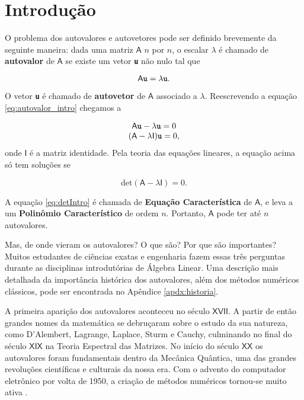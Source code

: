 \chapter{Introdução}
\label{cap:introducao}


	O problema dos autovalores e autovetores pode ser definido brevemente da seguinte maneira: dada uma matriz $\mathsf{A}$ $n$ por $n$, o escalar $\lambda$ é chamado de \textbf{autovalor} de $\mathsf{A}$ se existe um vetor \textbf{\texttt{u}} não nulo tal que

\begin{equation}\label{eq:autovalor_intro}
	\mathsf{A} \textbf{\texttt{u}} = \lambda \textbf{\texttt{u}}.
\end{equation}

O vetor \textbf{\texttt{u}} é chamado de \textbf{autovetor} de $\mathsf{A}$ associado a $\lambda$. Reescrevendo a equação \ref{eq:autovalor_intro} chegamos a 

\begin{equation}
		\begin{array}{c}
			\mathsf{A} \textbf{\texttt{u}} - \lambda \textbf{\texttt{u}} = 0 \\
			(\mathsf{A} - \lambda \mathsf{I})\textbf{\texttt{u}} = 0,
		\end{array}
\end{equation}
onde $\mathsf{I}$ é a matriz identidade. Pela teoria das equações lineares, a equação acima só tem soluções se

\begin{equation}\label{eq:detIntro}
	\mbox{det}(\mathsf{A} - \lambda \mathsf{I}) = 0.
\end{equation}

A equação \ref{eq:detIntro} é chamada de \textbf{Equação Característica} de $\mathsf{A}$, e leva a um \textbf{Polinômio Característico} de ordem $n$. Portanto, $\mathsf{A}$ pode ter até $n$ autovalores.

	Mas, de onde vieram os autovalores? O que são? Por que são importantes? Muitos estudantes de ciências exatas e engenharia fazem essas três perguntas durante as disciplinas introdutórias de Álgebra Linear. Uma descrição mais detalhada da importância histórica dos autovalores, além dos métodos numéricos clássicos, pode ser encontrada no Apêndice \ref{apdx:historia}.
	
	A primeira aparição dos autovalores aconteceu no século $\mathsf{XVII}$. A partir de então grandes nomes da matemática se debruçaram sobre o estudo da sua natureza, como D'Alembert, Lagrange, Laplace, Sturm e Cauchy, culminando no final do século $\mathsf{XIX}$ na Teoria Espectral das Matrizes. No início do século $\mathsf{XX}$ os autovalores foram fundamentais dentro da Mecânica Quântica, uma das grandes revoluções científicas e culturais da nossa era. Com o advento do computador eletrônico por volta de 1950, a criação de métodos numéricos tornou-se muito ativa \cite{Hawkins75}.
	

